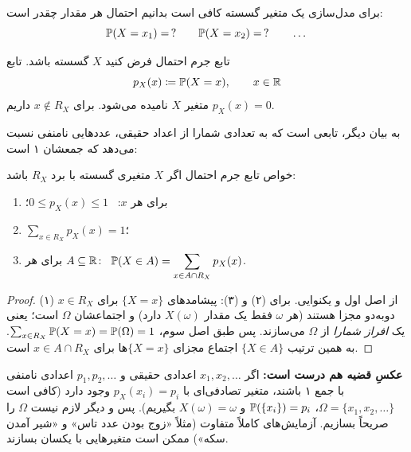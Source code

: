 برای مدل‌سازی یک متغیر گسسته کافی است بدانیم احتمال هر مقدار چقدر است:
\[ \P(X=x_1)=\,?\qquad \P(X=x_2)=\,?\qquad \dots \]

\begin{definition}[label=def:pmf]{تابع جرم احتمال}
فرض کنید $X$ گسسته باشد. تابع
\[ p_X(x)\defeq\P(X=x),\qquad x\in\R \]
 متغیر $X$ نامیده می‌شود. برای $x\notin R_X$ داریم $p_X(x)=0$.
\end{definition}

به بیان دیگر،  تابعی است که به تعدادی شمارا از اعداد حقیقی، عددهایی نامنفی نسبت می‌دهد که جمعشان ۱ است:

\begin{theorem}[label=thm:pmf-props]{خواص تابع جرم احتمال}
اگر $X$ متغیری گسسته با برد $R_X$ باشد:
\begin{enumerate}
  \item برای هر $x$: \ $0\le p_X(x)\le1$؛
  \item $\displaystyle\sum_{x\in R_X}p_X(x)=1$؛
  \item برای هر $A\subseteq\R$: \ $\displaystyle\P(X\in A)=\sum_{x\in A\cap R_X}p_X(x)$.
\end{enumerate}
\end{theorem}

\begin{proof}
(۱) از اصل اول و یکنوایی. برای (۲) و (۳): پیشامدهای $\{X=x\}$ برای $x\in R_X$ دوبه‌دو مجزا هستند (هر $\omega$ فقط یک مقدار $X(\omega)$ دارد) و اجتماعشان $\Omega$ است؛ یعنی یک \emph{افراز شمارا} از $\Omega$ می‌سازند. پس طبق اصل سوم، $\sum_{x\in R_X}\P(X=x)=\P(\Omega)=1$. به همین ترتیب $\{X\in A\}$ اجتماع مجزای $\{X=x\}$ها برای $x\in A\cap R_X$ است.
\end{proof}

\begin{note}
\textbf{عکسِ قضیه هم درست است:} اگر $x_1,x_2,\dots$ اعدادی حقیقی و $p_1,p_2,\dots$ اعدادی نامنفی با جمع ۱ باشند، متغیر تصادفی‌ای با $p_X(x_i)=p_i$ وجود دارد (کافی است $\Omega=\{x_1,x_2,\dots\}$، $\P(\{x_i\})=p_i$ و $X(\omega)=\omega$ بگیریم). پس  و دیگر لازم نیست $\Omega$ را صریحاً بسازیم. آزمایش‌های کاملاً متفاوت (مثلاً «زوج بودن عدد تاس» و «شیر آمدن سکه») ممکن است متغیرهایی با  یکسان بسازند.
\end{note}

